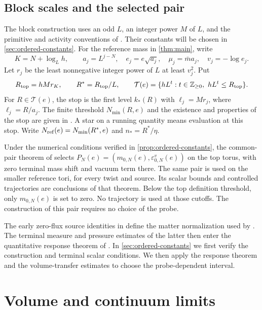\subsection{Block scales and the selected pair}\label{subsec:integration-block-data}
The block construction uses an odd $L$, an integer power $M$ of $L$,
and the primitive and activity conventions of
\cite{MaxwellBlock,FermionBlock,NormalizedContraction,NonlinearStep,CoverTuning}.
Their constants will be chosen in \cref{sec:ordered-constants}.
For the reference mass in \cref{thm:main}, write
\[
 K=N+\log_Lh,\qquad a_j=L^{j-N},\quad e_j=e\sqrt{a_j},
 \quad\mu_j=\bar m a_j,\quad v_j=-\log e_j.
\]
Let $r_j$ be the least nonnegative integer power of $L$ at least
$v_j^2$. Put
\[
 R_{\rm top}=hMr_K,\qquad R^*=R_{\rm top}/L,\qquad
 \mathcal T(e)=\{hL^t:t\in\mathbb Z_{\ge0},\ hL^t\le R_{\rm top}\}.
\]
For $R\in\mathcal T(e)$, the stop is the first level
$k_*(R)$ with $\ell_j=Mr_j$, where $\ell_j=R/a_j$.
The finite threshold $N_{\min}(R,e)$ and the existence and
properties of the stop are given in \cite[Proposition~6.1]{CoverTuning}.
A star on a running quantity means evaluation at this stop.
Write $N_{\rm ref}(e)=N_{\min}(R^*,e)$ and $n_*=R^*/\eta$.

Under the numerical conditions verified in \cref{prop:ordered-constants}, the common-pair theorem
of \cite[Theorem~A]{CoverTuning} selects
$P_N(e)=(m_{0,N}(e),\varepsilon^v_{0,N}(e))$ on the top torus,
with zero terminal mass shift and vacuum term there. The same pair
is used on the smaller reference tori, for every twist and source.
Its scalar bounds and controlled trajectories are conclusions of
that theorem. Below the top definition threshold, only
$m_{0,N}(e)$ is set to zero. No trajectory is used at those cutoffs.
The construction of this pair requires no choice of the probe.

The early zero-flux source identities in
\cite[Section~3]{ReferenceResponse} define the matter normalization
used by \cite{TerminalPressure}. The terminal measure and pressure
estimates of the latter then enter the quantitative response theorem
of \cite{ReferenceResponse}. In \cref{sec:ordered-constants} we
first verify the construction and terminal scalar conditions.
We then apply the response theorem and the volume-transfer estimates
to choose the probe-dependent interval.
\section{Volume and continuum limits}\label{sec:continuum-limits}

